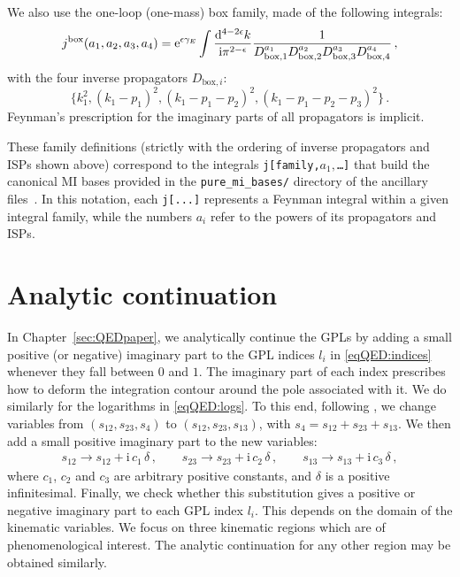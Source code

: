 \documentclass[main.tex]{subfiles}
\begin{document}
%
We also use the one-loop (one-mass) box family, made of the following integrals:
\begin{equation}
	j^{\rm box}(a_1, a_2, a_3, a_4) = \mathrm{e}^{\epsilon \gamma_{E}} \int \frac{\mathrm{d}^{4-2\epsilon} k}{\mathrm{i} \pi^{2-\epsilon}} \frac{1}{D_{\mathrm{box}, 1}^{a_1} D_{\mathrm{box},2}^{a_2} D_{\mathrm{box},3}^{a_3} D_{\mathrm{box},4}^{a_4}} \,,
\end{equation}
with the four inverse propagators $D_{\mathrm{box},i}$:
	\begin{equation}
		\big\{k_1^2, (k_1-p_1)^2, (k_1-p_1-p_2)^2, (k_1-p_1-p_2-p_3)^2 \big\} \,.
	\end{equation}
Feynman's prescription for the imaginary parts of all propagators is implicit.

These family definitions (strictly with the ordering of inverse propagators and ISPs shown above) correspond to the integrals \texttt{j[family,$a_1,$\ldots]} that build the canonical MI bases provided in the \texttt{pure\_mi\_bases/} directory of the ancillary files~\cite{zenodo}. In this notation, each \texttt{j[...]} represents a Feynman integral within a given integral family, while the numbers $a_i$ refer to the powers of its propagators and ISPs.

\renewcommand{\theequation}{G.\arabic{equation}}
\chapter{Analytic continuation} \label{app:an_cont}
In Chapter~\ref{sec:QEDpaper}, we analytically continue the GPLs by adding a small positive (or negative) imaginary part to the GPL indices $l_i$ in \cref{eqQED:indices} whenever they fall between $0$ and $1$. The imaginary part of each index prescribes how to deform the integration contour around the pole associated with it. We do similarly for the logarithms in \cref{eqQED:logs}.
To this end, following , we change variables from $(s_{12},s_{23},s_4)$ to $(s_{12},s_{23},s_{13})$, with $s_4 = s_{12} + s_{23} + s_{13}$. We then add a small positive imaginary part to the new variables:
\begin{align} \label{eq:add_im}
s_{12} \longrightarrow s_{12} + \mathrm{i} \, c_{1} \, \delta \, , \qquad
s_{23} \longrightarrow s_{23} + \mathrm{i} \, c_{2} \, \delta  \, , \qquad
s_{13} \longrightarrow s_{13} + \mathrm{i} \, c_{3} \, \delta  \, , 
\end{align}
where $c_{1}$, $c_{2}$ and $c_{3}$ are arbitrary positive constants, and $\delta$ is a positive infinitesimal. 
Finally, we check whether this substitution gives a positive or negative imaginary part to each GPL index $l_i$.
This depends on the domain of the kinematic variables.
We focus on three kinematic regions which are of phenomenological interest. The analytic continuation for any other region may be obtained similarly.
\end{document}
